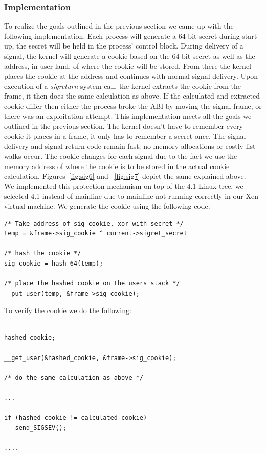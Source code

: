 \documentclass{sig-alternate-05-2015}
\begin{document}
\subsubsection{Implementation}
To realize the goals outlined in the previous section we came up with the following implementation. Each process will generate a 64 bit secret during start up, the secret will be held in the process' control block. During delivery of a signal, the kernel will generate a cookie based on the 64 bit secret as well as the address, in user-land, of where the cookie will be stored. From there the kernel places the cookie at the address and continues with normal signal delivery. Upon execution of a \textit{sigreturn} system call, the kernel extracts the cookie from the frame, it then does the same calculation as above. If the calculated and extracted cookie differ then either the process broke the ABI by moving the signal frame, or there was an exploitation attempt. This implementation meets all the goals we outlined in the previous section. The kernel doesn't have to remember every cookie it places in a frame, it only has to remember a secret once. The signal delivery and signal return code remain fast, no memory allocations or costly list walks occur. The cookie changes for each signal due to the fact we use the memory address of where the cookie is to be stored in the actual cookie calculation. Figures~\ref{fig:sig6} and ~\ref{fig:sig7} depict the same explained above.
\\
\indent
We implemented this protection mechanism on top of the 4.1 Linux tree, we selected 4.1 instead of mainline due to mainline not running correctly in our Xen virtual machine. We generate the cookie using the following code:
\\
\begin{verbatim}
/* Take address of sig cookie, xor with secret */
temp = &frame->sig_cookie ^ current->sigret_secret

/* hash the cookie */
sig_cookie = hash_64(temp);

/* place the hashed cookie on the users stack */
__put_user(temp, &frame->sig_cookie);

\end{verbatim}

To verify the cookie we do the following:

\begin{verbatim}

hashed_cookie;

__get_user(&hashed_cookie, &frame->sig_cookie);

/* do the same calculation as above */

...

if (hashed_cookie != calculated_cookie)
   send_SIGSEV();

....

\end{verbatim}
\end{document}
